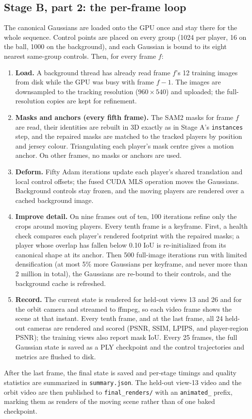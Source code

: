 \documentclass[11pt]{article}
\begin{document}
\subsection{Stage B, part 2: the per-frame loop}
The canonical Gaussians are loaded onto the GPU once and stay there for the whole sequence. Control
points are placed on every group (1024 per player, 16 on the ball, 1000 on the background), and each
Gaussian is bound to its eight nearest same-group controls. Then, for every frame $f$:
\begin{enumerate}
\item \textbf{Load.} A background thread has already read frame $f$'s 12 training images from disk
while the GPU was busy with frame $f-1$. The images are downsampled to the tracking resolution
($960\times540$) and uploaded; the full-resolution copies are kept for refinement.
\item \textbf{Masks and anchors (every fifth frame).} The SAM2 masks for frame $f$ are read, their
identities are rebuilt in 3D exactly as in Stage A's \texttt{instances} step, and the repaired masks
are matched to the tracked players by position and jersey colour. Triangulating each player's mask
centre gives a motion anchor. On other frames, no masks or anchors are used.
\item \textbf{Deform.} Fifty Adam iterations update each player's shared translation and local
control offsets; the fused CUDA MLS operation moves the Gaussians. Background controls stay frozen,
and the moving players are rendered over a cached background image.
\item \textbf{Improve detail.} On nine frames out of ten, 100 iterations refine only the crops
around moving players. Every tenth frame is a keyframe. First, a health check compares each
player's rendered footprint with the repaired masks; a player whose overlap has fallen below
0.10 IoU is re-initialized from its canonical shape at its anchor. Then 500 full-image iterations
run with limited densification (at most 5\% more Gaussians per keyframe, and never more than 2 million
in total), the Gaussians are re-bound to their controls, and the background
cache is refreshed.
\item \textbf{Record.} The current state is rendered for held-out views 13 and 26 and for the orbit
camera and streamed to ffmpeg, so each video frame shows the scene at that instant. Every tenth
frame, and at the last frame, all 24 held-out cameras are rendered and scored (PSNR, SSIM, LPIPS,
and player-region PSNR); the training views also report mask IoU. Every 25 frames, the full
Gaussian state is saved as a PLY checkpoint and the control trajectories and metrics are flushed
to disk.
\end{enumerate}
After the last frame, the final state is saved and per-stage timings and quality statistics are
summarized in \texttt{summary.json}. The held-out view-13 video and the orbit video are then
published to \texttt{final\_renders/} with an \texttt{animated\_} prefix, marking them as renders
of the moving scene rather than of one baked checkpoint.
\end{document}
